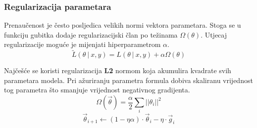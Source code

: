 \documentclass[times, utf8, numeric, diplomski]{fer}
\def\probsep{\ |\ }
\def\TODO#1{\noindent\textcolor{red}{TODO: \textit{#1}}\newline}
\def\todo#1{\TODO{#1}}
\begin{document}
\subsubsection{Regularizacija parametara}
Prenaučenost je često posljedica velikih normi vektora parametara. Stoga se u funkciju gubitka dodaje regularizacijski član po težinama $\Omega(\theta)$. Utjecaj regularizacije moguće je mijenjati hiperparametrom $\alpha$.
\begin{equation}
\label{eq:weights_regularization}
\tilde{L}(\theta \probsep x,y) = L(\theta \probsep x,y) + \alpha\Omega(\theta)
\end{equation}

Najčešće se koristi regularizacija \textbf{L2} normom koja akumulira kvadrate svih parametara modela. Pri ažuriranju parametra formula dobiva skaliranu vrijednost tog parametra što smanjuje vrijednost negativnog gradijenta.
\begin{equation}
\Omega(\vec{\theta}) = \frac{\alpha}{2} \sum_i ||\theta_i||^2
\end{equation}
\begin{equation}
\vec{\theta}_{i+1} \gets (1- \eta \alpha) \cdot \vec{\theta}_i - \eta \cdot \vec{g}_i
\end{equation}


%
\end{document}
